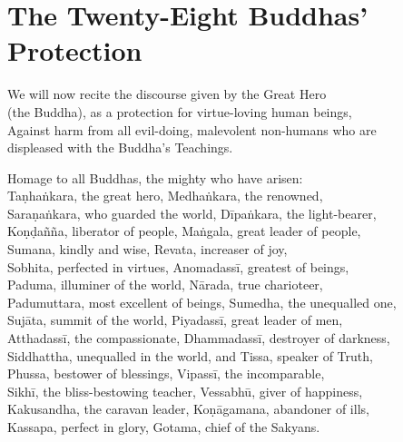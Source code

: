 
\cleartoverso


\chapterTocDelegatePageNumber
\chapter{The Twenty-Eight Buddhas' Protection}%

\setTocDelegatedPageNumber

\vspace*{5pt}

{\setlength{\parskip}{0pt}%

\begin{soloonechants}
We will now recite the discourse given by the Great Hero\\
(the Buddha), as a protection for virtue-loving human beings,\\
Against harm from all evil-doing, malevolent non-humans who are\\
displeased with the Buddha's Teachings.\\
\end{soloonechants}%
}

\vspace*{-2pt}

\englishText

\begin{onechants}
Homage to all Buddhas, the mighty who have arisen:\\
Taṇhaṅkara, the great hero, Medhaṅkara, the renowned,\\
Saraṇaṅkara, who guarded the world, Dīpaṅkara, the light-bearer,\\
Koṇḍañña, liberator of people, Maṅgala, great leader of people,\\
Sumana, kindly and wise, Revata, increaser of joy,\\
Sobhita, perfected in virtues, Anomadassī, greatest of beings,\\
Paduma, illuminer of the world, Nārada, true charioteer,\\
Padumuttara, most excellent of beings, Sumedha, the unequalled one,\\
Sujāta, summit of the world,  Piyadassī, great leader of men,\\
Atthadassī, the compassionate, Dhammadassī, destroyer of darkness,\\
Siddhattha, unequalled in the world,  and Tissa, speaker of Truth,\\
Phussa, bestower of blessings, Vipassī, the incomparable,\\
Sikhī, the bliss-bestowing teacher, Vessabhū, giver of happiness,\\
Kakusandha, the caravan leader, Koṇāgamana, abandoner of ills,\\
Kassapa, perfect in glory, Gotama, chief of the Sakyans.\\
\end{onechants}

